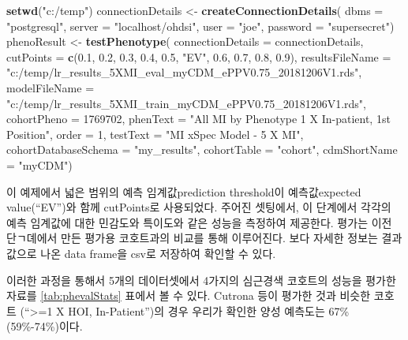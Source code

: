\documentclass[11pt]{book}
\newenvironment{Shaded}{\begin{snugshade}}{\end{snugshade}}
\newcommand{\KeywordTok}[1]{\textcolor[rgb]{0.13,0.29,0.53}{\textbf{#1}}}
\newcommand{\DataTypeTok}[1]{\textcolor[rgb]{0.13,0.29,0.53}{#1}}
\newcommand{\DecValTok}[1]{\textcolor[rgb]{0.00,0.00,0.81}{#1}}
\newcommand{\FloatTok}[1]{\textcolor[rgb]{0.00,0.00,0.81}{#1}}
\newcommand{\StringTok}[1]{\textcolor[rgb]{0.31,0.60,0.02}{#1}}
\newcommand{\NormalTok}[1]{#1}
\theoremstyle{definition}
\theoremstyle{definition}
\theoremstyle{definition}
\theoremstyle{remark}
\begin{document}
\begin{Shaded}
\begin{Highlighting}[]
\KeywordTok{setwd}\NormalTok{(}\StringTok{"c:/temp"}\NormalTok{)}
\NormalTok{connectionDetails <-}\StringTok{ }\KeywordTok{createConnectionDetails}\NormalTok{(}
  \DataTypeTok{dbms =} \StringTok{"postgresql"}\NormalTok{,}
  \DataTypeTok{server =} \StringTok{"localhost/ohdsi"}\NormalTok{,}
  \DataTypeTok{user =} \StringTok{"joe"}\NormalTok{,}
  \DataTypeTok{password =} \StringTok{"supersecret"}\NormalTok{)}
\NormalTok{phenoResult <-}\StringTok{ }\KeywordTok{testPhenotype}\NormalTok{(}
  \DataTypeTok{connectionDetails =}\NormalTok{ connectionDetails,}
  \DataTypeTok{cutPoints =} \KeywordTok{c}\NormalTok{(}\FloatTok{0.1}\NormalTok{, }\FloatTok{0.2}\NormalTok{, }\FloatTok{0.3}\NormalTok{, }\FloatTok{0.4}\NormalTok{, }\FloatTok{0.5}\NormalTok{, }\StringTok{"EV"}\NormalTok{, }\FloatTok{0.6}\NormalTok{, }\FloatTok{0.7}\NormalTok{, }\FloatTok{0.8}\NormalTok{, }\FloatTok{0.9}\NormalTok{),}
  \DataTypeTok{resultsFileName =}
    \StringTok{"c:/temp/lr_results_5XMI_eval_myCDM_ePPV0.75_20181206V1.rds"}\NormalTok{,}
  \DataTypeTok{modelFileName =}
    \StringTok{"c:/temp/lr_results_5XMI_train_myCDM_ePPV0.75_20181206V1.rds"}\NormalTok{,}
  \DataTypeTok{cohortPheno =} \DecValTok{1769702}\NormalTok{,}
  \DataTypeTok{phenText =} \StringTok{"All MI by Phenotype 1 X In-patient, 1st Position"}\NormalTok{,}
  \DataTypeTok{order =} \DecValTok{1}\NormalTok{,}
  \DataTypeTok{testText =} \StringTok{"MI xSpec Model - 5 X MI"}\NormalTok{,}
  \DataTypeTok{cohortDatabaseSchema =} \StringTok{"my_results"}\NormalTok{,}
  \DataTypeTok{cohortTable =} \StringTok{"cohort"}\NormalTok{,}
  \DataTypeTok{cdmShortName =} \StringTok{"myCDM"}\NormalTok{)}
\end{Highlighting}
\end{Shaded}

이 예제에서 넓은 범위의 예측 임계값prediction threshold이 예측값expected
value(``EV'')와 함께 cutPoints로 사용되었다. 주어진 셋팅에서, 이
단계에서 각각의 예측 임계값에 대한 민감도와 특이도와 같은 성능을
측정하여 제공한다. 평가는 이전 단ㄱ뎨에서 만든 평가용 코호트과의 비교를
통해 이루어진다. 보다 자세한 정보는 결과값으로 나온 data frame을 csv로
저장하여 확인할 수 있다.

이러한 과정을 통해서 5개의 데이터셋에서 4가지의 심근경색 코호트의 성능을
평가한 자료를 \ref{tab:phevalStats} 표에서 볼 수 있다. Cutrona 등이
평가한 것과 비슷한 코호트 (``\textgreater{}=1 X HOI, In-Patient'')의
경우 우리가 확인한 양성 예측도는 67\% (59\%-74\%)이다.
\end{document}
